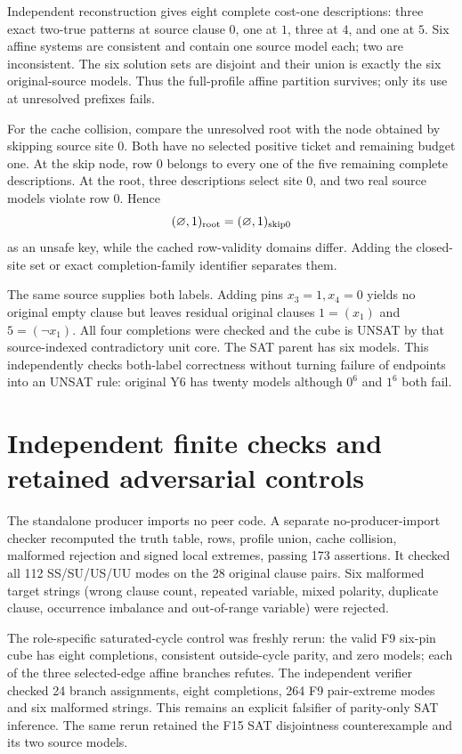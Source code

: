 \documentclass[11pt]{article}
\begin{document}
Independent reconstruction gives eight complete cost-one descriptions: three exact two-true patterns at source clause $0$, one at $1$, three at $4$, and one at $5$.  Six affine systems are consistent and contain one source model each; two are inconsistent.  The six solution sets are disjoint and their union is exactly the six original-source models.  Thus the full-profile affine partition survives; only its use at unresolved prefixes fails.

For the cache collision, compare the unresolved root with the node obtained by skipping source site $0$.  Both have no selected positive ticket and remaining budget one.  At the skip node, row $0$ belongs to every one of the five remaining complete descriptions.  At the root, three descriptions select site $0$, and two real source models violate row $0$.  Hence
\[
 (\varnothing,1)_{\rm root}=(\varnothing,1)_{\rm skip0}
\]
as an unsafe key, while the cached row-validity domains differ.  Adding the closed-site set or exact completion-family identifier separates them.

The same source supplies both labels.  Adding pins $x_3=1,x_4=0$ yields no original empty clause but leaves residual original clauses $1=(x_1)$ and $5=(\neg x_1)$.  All four completions were checked and the cube is UNSAT by that source-indexed contradictory unit core.  The SAT parent has six models.  This independently checks both-label correctness without turning failure of endpoints into an UNSAT rule: original Y6 has twenty models although $0^6$ and $1^6$ both fail.

\section{Independent finite checks and retained adversarial controls}
The standalone producer imports no peer code.  A separate no-producer-import checker recomputed the truth table, rows, profile union, cache collision, malformed rejection and signed local extremes, passing 173 assertions.  It checked all 112 SS/SU/US/UU modes on the 28 original clause pairs.  Six malformed target strings (wrong clause count, repeated variable, mixed polarity, duplicate clause, occurrence imbalance and out-of-range variable) were rejected.

The role-specific saturated-cycle control was freshly rerun: the valid F9 six-pin cube has eight completions, consistent outside-cycle parity, and zero models; each of the three selected-edge affine branches refutes.  The independent verifier checked 24 branch assignments, eight completions, 264 F9 pair-extreme modes and six malformed strings.  This remains an explicit falsifier of parity-only SAT inference.  The same rerun retained the F15 SAT disjointness counterexample and its two source models.
\end{document}
